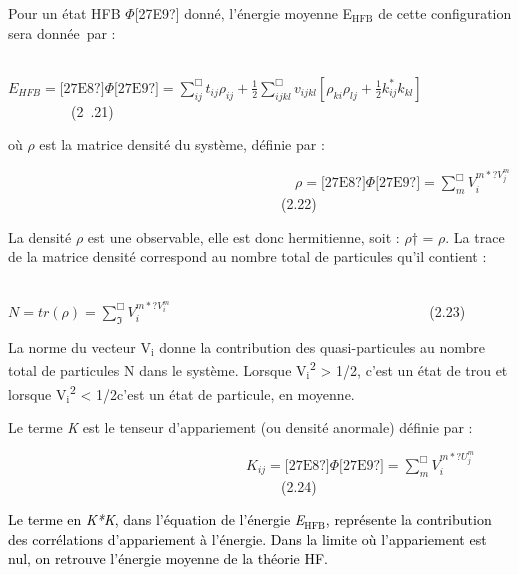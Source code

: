 \documentclass[a4paper]{article}
\providecommand\textsubscript[1]{\ensuremath{{}_{\text{#1}}}}
\begin{document}
Pour un état HFB {\textbar}$\Phi $[27E9?] donné, l’énergie moyenne E\textsubscript{HFB} de cette configuration sera
donnée~par :

\ \ \ \ \ \ \ \ \ \ \ \ \ \  $E_{\mathit{HFB}}=\text{[27E8?]}\Phi \text{[27E9?]}=\sum _{\mathit{ij}}^{\Box
}t_{\mathit{ij}}\rho _{\mathit{ij}}+\frac 1 2\sum _{\mathit{ijkl}}^{\Box }v_{\mathit{ijkl}}\left[\rho
_{\mathit{ki}}\rho _{\mathit{lj}}+\frac 1 2k_{\mathit{ij}}^{\ast }k_{\mathit{kl}}\right]$\ \ \ \ \ \ \ \ \ (2~.21)

où $\rho $ est la matrice densité du système, définie par :

\ \ \ \ \ \ \ \ \ \ \ \ \ \ \ \ \ \ \ \ \ \ \ \ \ \ \ \ \ \ \ \ \ \ \ \ \ \ \ \ \  $\rho =\text{[27E8?]}\Phi
\text{[27E9?]}=\sum _m^{\Box }V_i^{m\ast
?V_j^m}$\ \ \ \ \ \ \ \ \ \ \ \ \ \ \ \ \ \ \ \ \ \ \ \ \ \ \ \ \ \ \ \ \ \ \ \ \ \ \ (2.22)

La densité $\rho $ est une observable, elle est donc hermitienne, soit : $\rho $† = $\rho $. La trace de la matrice
densité correspond au nombre total de particules qu’il contient :

\ \ \ \ \ \ \ \ \ \ \ \ \ \ \ \ \ \ \ \ \ \ \ \ \ \ \ \ \ \ \ \ \ \ \ \ \ \ \ \ \ \ \ \ \ \ \ \ \ \ \ \ \ 
$N=\mathit{tr}\left(\rho \right)=\sum _{\Im }^{\Box }V_i^{m\ast
?V_i^m}$\ \ \ \ \ \ \ \ \ \ \ \ \ \ \ \ \ \ \ \ \ \ \ \ \ \ \ \ \ \ \ \ \ \ \ \ \ (2.23)

La norme du vecteur V\textit{\textsubscript{i}} donne la contribution des quasi-particules au nombre total de particules
N dans le système. Lorsque {\textbar}V\textit{\textsubscript{i}}{\textbar}\textsuperscript{2} {\textgreater} 1/2, c’est
un état de trou et lorsque {\textbar}V\textit{\textsubscript{i}}{\textbar}\textsuperscript{2} {\textless} 1/2c’est un
état de particule, en moyenne.

Le terme \textit{K} est le tenseur d’appariement (ou densité anormale) définie par :

\ \ \ \ \ \ \ \ \ \ \ \ \ \ \ \ \ \ \ \ \ \ \ \ \ \ \ \ \ \ \ \ \ \  $K_{\mathit{ij}}=\text{[27E8?]}\Phi
\text{[27E9?]}=\sum _m^{\Box }V_i^{m\ast
?U_j^m}$\ \ \ \ \ \ \ \ \ \ \ \ \ \ \ \ \ \ \ \ \ \ \ \ \ \ \ \ \ \ \ \ \ \ \ \ \ \ \ (2.24)

\textcolor{black}{Le terme en }\textit{\textcolor{black}{K*K}}\textcolor{black}{, dans l’équation de l’énergie
}\textit{\textcolor{black}{E}}\textit{\textcolor{black}{\textsubscript{HFB}}}\textcolor{black}{, représente la
contribution des corrélations d’appariement à l’énergie. Dans la limite où l’appariement est nul, on retrouve l’énergie
moyenne de la théorie HF.}
\end{document}

